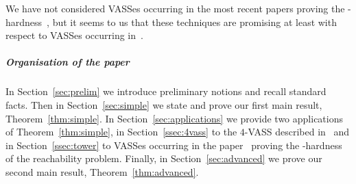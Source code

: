 We have not considered VASSes occurring in the most recent papers
proving the \ackermann-hardness~\cite{DBLP:conf/focs/Leroux21,DBLP:conf/focs/CzerwinskiO21},
but it seems to us that these techniques are promising
at least with respect to VASSes occurring in~\cite{DBLP:conf/focs/CzerwinskiO21}.

\subparagraph*{Organisation of the paper}
In Section~\ref{sec:prelim} we introduce preliminary notions and recall standard facts. Then in Section~\ref{sec:simple}
we state and prove our first main result, Theorem~\ref{thm:simple}.
In Section~\ref{sec:applications} we provide two applications of Theorem~\ref{thm:simple},
in Section~\ref{ssec:4vass} to the $4$-VASS described in~\cite{DBLP:conf/concur/Czerwinski0LLM20}
and in Section~\ref{ssec:tower} to VASSes occurring in the paper~\cite{DBLP:conf/stoc/CzerwinskiLLLM19} proving the \tower-hardness
of the reachability problem.
Finally, in Section~\ref{sec:advanced} we prove our second main result, Theorem~\ref{thm:advanced}.




